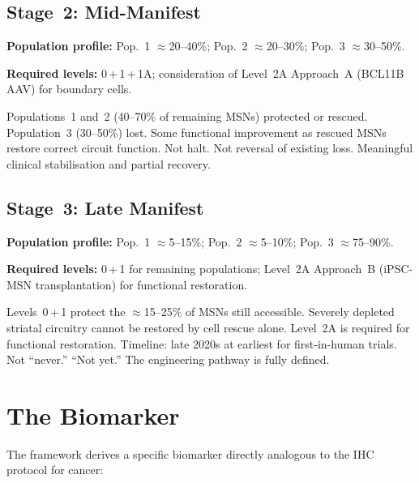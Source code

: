 \documentclass[12pt,a4paper]{article}
\newenvironment{predenv}[1]{%
  \begin{tcolorbox}[
    colback=blue!4,
    colframe=headerblue,
    boxrule=1pt,
    arc=3pt,
    title={\bfseries\color{white}#1},
    colbacktitle=headerblue,
    left=8pt, right=8pt,
    top=6pt, bottom=6pt,
    breakable
  ]
}{%
  \end{tcolorbox}
}
\begin{document}
\subsection{Stage~2: Mid-Manifest}

\textbf{Population profile:}
Pop.~1 $\approx$20--40\%;
Pop.~2 $\approx$20--30\%;
Pop.~3 $\approx$30--50\%.

\textbf{Required levels:}
0\,+\,1\,+\,1A; consideration of Level~2A Approach~A
(BCL11B AAV) for boundary cells.

\begin{predenv}{Geometric Prediction --- Stage 2:
Stabilisation with Partial Recovery}
Populations~1 and~2 (40--70\% of remaining MSNs)
protected or rescued. Population~3 (30--50\%) lost.
Some functional improvement as rescued MSNs restore
correct circuit function. Not halt. Not reversal of
existing loss. Meaningful clinical stabilisation and
partial recovery.
\end{predenv}

\subsection{Stage~3: Late Manifest}

\textbf{Population profile:}
Pop.~1 $\approx$5--15\%;
Pop.~2 $\approx$5--10\%;
Pop.~3 $\approx$75--90\%.

\textbf{Required levels:}
0\,+\,1 for remaining populations; Level~2A Approach~B
(iPSC-MSN transplantation) for functional restoration.

\begin{predenv}{Geometric Prediction --- Stage 3:
Stabilisation + Cell-Replacement-Dependent Recovery}
Levels~0\,+\,1 protect the $\approx$15--25\% of MSNs
still accessible. Severely depleted striatal circuitry
cannot be restored by cell rescue alone. Level~2A is
required for functional restoration. Timeline: late 2020s
at earliest for first-in-human trials. Not ``never.''
``Not yet.'' The engineering pathway is fully defined.
\end{predenv}

\section{The Biomarker}

The framework derives a specific biomarker directly
analogous to the IHC protocol for cancer:
\end{document}
